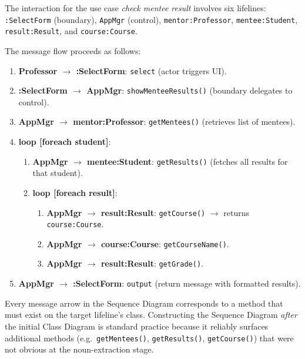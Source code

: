\documentclass[11pt, a4paper, notitlepage]{report}
\theoremstyle{definition}
\theoremstyle{remark}
\theoremstyle{definition}
\begin{document}
\begin{sloppypar}
The interaction for the use case \emph{check mentee result} involves six lifelines:
\texttt{:SelectForm} (boundary), \texttt{AppMgr} (control),
\texttt{mentor:Professor}, \texttt{mentee:Student}, \texttt{result:Result},
and \texttt{course:Course}.
\end{sloppypar}

The message flow proceeds as follows:
\begin{enumerate}
  \item \textbf{Professor $\to$ :SelectForm}: \texttt{select} (actor triggers UI).
  \item \textbf{:SelectForm $\to$ AppMgr}: \texttt{showMenteeResults()} (boundary delegates to control).
  \item \textbf{AppMgr $\to$ mentor:Professor}: \texttt{getMentees()} (retrieves list of mentees).
  \item \textbf{loop [foreach student]}:
    \begin{enumerate}
      \item \textbf{AppMgr $\to$ mentee:Student}: \texttt{getResults()} (fetches all results for that student).
      \item \textbf{loop [foreach result]}:
        \begin{enumerate}
          \item \textbf{AppMgr $\to$ result:Result}: \texttt{getCourse()} $\to$ returns \texttt{course:Course}.
          \item \textbf{AppMgr $\to$ course:Course}: \texttt{getCourseName()}.
          \item \textbf{AppMgr $\to$ result:Result}: \texttt{getGrade()}.
        \end{enumerate}
    \end{enumerate}
  \item \textbf{AppMgr $\to$ :SelectForm}: \texttt{output} (return message with formatted results).
\end{enumerate}

\begin{examtip}[title={Exam Tip: Discovering Methods from Sequence Diagrams}]
Every message arrow in the Sequence Diagram corresponds to a method that must exist on the
target lifeline's class. Constructing the Sequence Diagram \emph{after} the initial Class
Diagram is standard practice because it reliably surfaces additional methods (e.g.\
\texttt{getMentees()}, \texttt{getResults()}, \texttt{getCourse()}) that were not obvious
at the noun-extraction stage.
\end{examtip}
\end{document}
